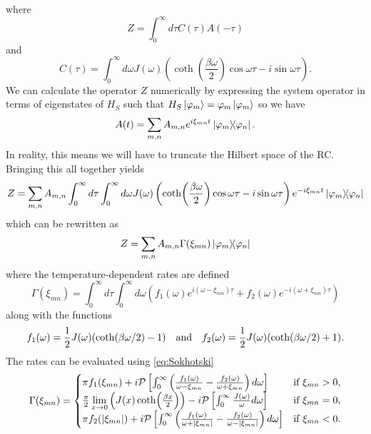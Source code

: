 \documentclass[]{article}
\begin{document}
where
\begin{equation}
Z = \int_{0}^{\infty}d\tau C(\tau)A(-\tau)
\end{equation}
and
\begin{equation}
C(\tau) = \int_{0}^{\infty}d\omega J(\omega)\left(\coth(\frac{\beta \omega}{2}) \cos\omega\tau - i\sin\omega\tau\right).
\end{equation}
We can calculate the operator $Z$ numerically by expressing the system operator in terms of eigenstates of $H_S$ such that $H_S\ket{\varphi_m}=\varphi_m\ket{\varphi_m}$ so we have
\begin{equation}
\label{eq:Adecomposition}
A(t) = \sum_{m,n} A_{m,n} e^{i\xi_{mn}t}\dyad{\varphi_m}{\varphi_n}.
\end{equation}
In reality, this means we will have to truncate the Hilbert space of the RC. Bringing this all together yields
\begin{equation}
Z = \sum_{m,n} A_{m,n} \int_{0}^{\infty}d\tau \int_{0}^{\infty}d\omega J(\omega)\left(\coth(\frac{\beta \omega}{2}) \cos\omega\tau - i\sin\omega\tau\right)e^{-i\xi_{mn}t}\dyad{\varphi_m}{\varphi_n}
\end{equation}
which can be rewritten as
\begin{equation}
Z = \sum_{m,n} A_{m,n} \Gamma(\xi_{mn}) \dyad{\varphi_m}{\varphi_n}
\end{equation}
where the temperature-dependent rates are defined
\begin{equation}
\Gamma(\xi_{mn}) = \int_{0}^{\infty}d\tau \int_{0}^{\infty}d\omega \left(f_1(\omega)e^{i(\omega-\xi_{mn})\tau} + f_2(\omega)e^{-i(\omega+\xi_{mn})\tau}\right)
\end{equation}
along with the functions
\begin{equation}
f_1(\omega) = \frac{1}{2}J(\omega)(\coth(\beta \omega/2)-1) \quad \textnormal{and} \quad f_2(\omega)= \frac{1}{2}J(\omega)(\coth(\beta \omega/2)+1).
\end{equation}
The rates can be evaluated using \ref{eq:Sokhotski}
\begin{equation}
\Gamma(\xi_{mn}) =
\begin{cases}
\pi f_1(\xi_{mn}) + i\mathcal{P}\left[\int_{0}^{\infty}\left(\frac{f_1(\omega)}{\omega-\xi_{mn}} - \frac{f_2(\omega)}{\omega+\xi_{mn}}\right)d\omega\right] & \text{if } \xi_{mn}>0,\\ 
\frac{\pi}{2}\lim\limits_{x\to 0}\left(J(x)\coth(\frac{\beta x}{2})\right) - i\mathcal{P}\left[\int_{0}^{\infty}\frac{J(\omega)}{\omega}d\omega\right] & \text{if } \xi_{mn}=0,\\ 
\pi f_2(\abs{\xi_{mn}}) + i\mathcal{P}\left[\int_{0}^{\infty}\left(\frac{f_1(\omega)}{\omega+\abs{\xi_{mn}}} - \frac{f_2(\omega)}{\omega-\abs{\xi_{mn}}}\right)d\omega\right]  & \text{if } \xi_{mn}<0.
\end{cases}
\end{equation}
\end{document}
